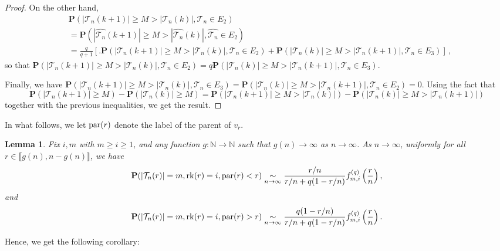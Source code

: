 \documentclass{article}
\newtheorem{lemma}[theorem]{Lemma}
\theoremstyle{remark}
\newcommand{\bN}{\mathbb{N}}
\newcommand{\abs}[1]{{\left|#1\right|}}
\newcommand{\cT}{\mathcal{T}}
\newcommand{\prob}[1]{\mathbf{P}{\left(#1\right)}}
\DeclareMathOperator{\rk}{rk}
\begin{document}
\begin{proof}
On the other hand,
\begin{align*}
&\prob{\abs{\cT_n(k+1)} \geq M > \abs{\cT_n(k)}, \cT_n \in E_2} 
\\&= \prob{\abs{\hat{\cT_n}(k+1)} \geq M > \abs{\hat{\cT_n}(k)}, \hat{\cT_n} \in E_2}\\
&= \frac{q}{q+1} \left[\Big. \prob{\abs{\cT_n(k+1)} \geq M > \abs{\cT_n(k)}, \cT_n \in E_2} + \prob{\abs{\cT_n(k)} \geq M > \abs{\cT_n(k+1)}, \cT_n \in E_3} \right] \,,
\end{align*}
so that $\prob{\abs{\cT_n(k+1)} \geq M > \abs{\cT_n(k)}, \cT_n \in E_2} = q \prob{\abs{\cT_n(k)} \geq M > \abs{\cT_n(k+1)}, \cT_n \in E_3}$.

Finally, we have $\prob{\abs{\cT_n(k+1)} \geq M > \abs{\cT_n(k)}, \cT_n \in E_3} = \prob{\abs{\cT_n(k)} \geq M > \abs{\cT_n(k+1)}, \cT_n \in E_2}=0$.
Using the fact that 
\[ 
    \prob{\abs{\cT_n(k+1)} \geq M} - \prob{\abs{\cT_n(k)} \geq M} = \prob{\abs{\cT_n(k+1)} \geq M > \abs{\cT_n(k)}} - \prob{\abs{\cT_n(k)} \geq M > \abs{\cT_n(k+1)}}
\]
together with the previous inequalities, we get the result.
\end{proof}

In what follows, we let ${\rm par}(r)$ denote the label of the parent of $v_r$.

\begin{lemma}
\label{lem:distribution of the small tree}
Fix $i,m$ with $m \geq i \geq 1$, and any function $g: \bN \rightarrow \bN$ such that $g(n) \rightarrow \infty$ as $n \rightarrow \infty$. As $n \rightarrow \infty$, uniformly for all $r \in \llbracket g(n), n-g(n) \rrbracket$, we have
\begin{align*}
    \prob{\abs{\cT_n(r)}=m, \rk(r)=i, {\rm par}(r) < r} \underset{n \rightarrow \infty}{\sim} \frac{r/n}{r/n+q(1-r/n)} f_{m,i}^{(q)}\left(\frac{r}{n}\right),
\end{align*}
and 
\begin{align*}
    \prob{\abs{\cT_n(r)}=m, \rk(r)=i, {\rm par}(r) > r} \underset{n \rightarrow \infty}{\sim} \frac{q(1-r/n)}{r/n+q(1-r/n)}f_{m,i}^{(q)}\left(\frac{r}{n}\right).
\end{align*}
\end{lemma}

Hence, we get the following corollary:
\end{document}
